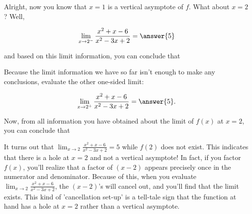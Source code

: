 \documentclass[handout]{ximera}
\begin{document}
\begin{exercise}
\begin{exercise}
\begin{exercise}
Alright, now you know that $x=1$ is a vertical asymptote of $f$.  What about $x=2$?  Well, 

\[ \displaystyle\lim_{x \to 2^-} \frac{x^2+x-6}{x^2-3x+2} = \answer{5} \]

and based on this limit information, you can conclude that

\begin{multipleChoice}
\end{multipleChoice}

\begin{exercise}
Because the limit information we have so far isn't enough to make any conclusions, evaluate the other one-sided limit: 

\[ \displaystyle\lim_{x \to 2^+} \frac{x^2+x-6}{x^2-3x+2} = \answer{5}. \]

Now, from all information you have obtained about the limit of $f(x)$ at $x=2$, you can conclude that 

\begin{multipleChoice}
    
    \begin{feedback}[correct]
    It turns out that $\displaystyle\lim_{x \to 2} \frac{x^2+x-6}{x^2-3x+2} = 5$ while $f(2)$ does not exist.  This indicates that there is a hole at $x=2$ and not a vertical asymptote!  In fact, if you factor $f(x)$, you'll realize that a factor of $(x-2)$ appears precisely once in the numerator and denominator.  Because of this, when you evaluate $\displaystyle\lim_{x \to 2} \frac{x^2+x-6}{x^2-3x+2}$, the $(x-2)$'s will cancel out, and you'll find that the limit exists.  This kind of 'cancellation set-up' is a tell-tale sign that the function at hand has a hole at $x=2$ rather than a vertical asymptote.  
    \end{feedback}
\end{multipleChoice}

\end{exercise}

\end{exercise}

\end{exercise}

\end{exercise}
\end{document}
